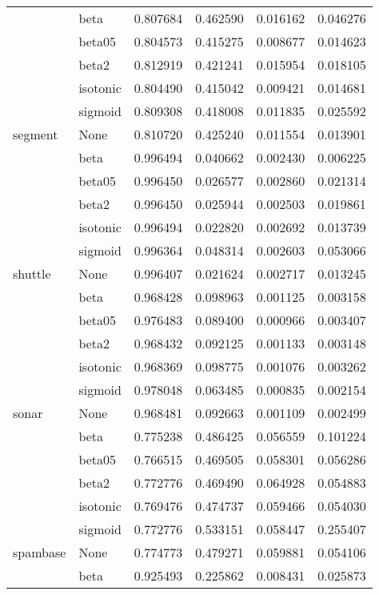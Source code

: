 \begin{tabular}{llrrrr}
        & beta &  0.807684 &  0.462590 &  0.016162 &  0.046276 \\
        & beta05 &  0.804573 &  0.415275 &  0.008677 &  0.014623 \\
        & beta2 &  0.812919 &  0.421241 &  0.015954 &  0.018105 \\
        & isotonic &  0.804490 &  0.415042 &  0.009421 &  0.014681 \\
        & sigmoid &  0.809308 &  0.418008 &  0.011835 &  0.025592 \\
segment & None &  0.810720 &  0.425240 &  0.011554 &  0.013901 \\
        & beta &  0.996494 &  0.040662 &  0.002430 &  0.006225 \\
        & beta05 &  0.996450 &  0.026577 &  0.002860 &  0.021314 \\
        & beta2 &  0.996450 &  0.025944 &  0.002503 &  0.019861 \\
        & isotonic &  0.996494 &  0.022820 &  0.002692 &  0.013739 \\
        & sigmoid &  0.996364 &  0.048314 &  0.002603 &  0.053066 \\
shuttle & None &  0.996407 &  0.021624 &  0.002717 &  0.013245 \\
        & beta &  0.968428 &  0.098963 &  0.001125 &  0.003158 \\
        & beta05 &  0.976483 &  0.089400 &  0.000966 &  0.003407 \\
        & beta2 &  0.968432 &  0.092125 &  0.001133 &  0.003148 \\
        & isotonic &  0.968369 &  0.098775 &  0.001076 &  0.003262 \\
        & sigmoid &  0.978048 &  0.063485 &  0.000835 &  0.002154 \\
sonar & None &  0.968481 &  0.092663 &  0.001109 &  0.002499 \\
        & beta &  0.775238 &  0.486425 &  0.056559 &  0.101224 \\
        & beta05 &  0.766515 &  0.469505 &  0.058301 &  0.056286 \\
        & beta2 &  0.772776 &  0.469490 &  0.064928 &  0.054883 \\
        & isotonic &  0.769476 &  0.474737 &  0.059466 &  0.054030 \\
        & sigmoid &  0.772776 &  0.533151 &  0.058447 &  0.255407 \\
spambase & None &  0.774773 &  0.479271 &  0.059881 &  0.054106 \\
        & beta &  0.925493 &  0.225862 &  0.008431 &  0.025873 \\

\end{tabular}
